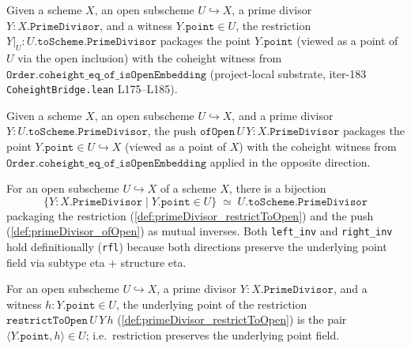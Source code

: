\begin{definition}

  \label{def:primeDivisor_restrictToOpen}
  Given a scheme \(X\), an open subscheme \(U \hookrightarrow X\), a prime
  divisor \(Y : X.\texttt{PrimeDivisor}\), and a witness \(Y.\texttt{point} \in U\),
  the restriction \(Y |_U : U.\texttt{toScheme}.\texttt{PrimeDivisor}\) packages
  the point \(Y.\texttt{point}\) (viewed as a point of \(U\) via the open
  inclusion) with the coheight witness from
  \(\texttt{Order.coheight\_eq\_of\_isOpenEmbedding}\) (project-local
  substrate, iter-183 \texttt{CoheightBridge.lean} L175--L185).
\end{definition}
\begin{definition}

  \label{def:primeDivisor_ofOpen}
  Given a scheme \(X\), an open subscheme \(U \hookrightarrow X\), and a
  prime divisor \(Y : U.\texttt{toScheme}.\texttt{PrimeDivisor}\), the push
  \(\texttt{ofOpen}\,U\,Y : X.\texttt{PrimeDivisor}\) packages the point
  \(Y.\texttt{point} \in U \hookrightarrow X\) (viewed as a point of \(X\))
  with the coheight witness from
  \(\texttt{Order.coheight\_eq\_of\_isOpenEmbedding}\) applied in the
  opposite direction.
\end{definition}
\begin{lemma}

  \label{lem:primeDivisor_equivOpen}
  For an open subscheme \(U \hookrightarrow X\) of a scheme \(X\), there is a
  bijection
  \[
    \{Y : X.\texttt{PrimeDivisor} \mid Y.\texttt{point} \in U\}
    \;\simeq\;
    U.\texttt{toScheme}.\texttt{PrimeDivisor}
  \]
  packaging the restriction (\ref{def:primeDivisor_restrictToOpen}) and the
  push (\ref{def:primeDivisor_ofOpen}) as mutual inverses. Both
  \texttt{left\_inv} and \texttt{right\_inv} hold definitionally
  (\texttt{rfl}) because both directions preserve the underlying point
  field via subtype eta + structure eta.
\end{lemma}
\begin{lemma}

  \label{lem:primeDivisor_restrictToOpen_point}
  For an open subscheme \(U \hookrightarrow X\), a prime divisor
  \(Y : X.\texttt{PrimeDivisor}\), and a witness \(h : Y.\texttt{point} \in U\),
  the underlying point of the restriction
  \(\texttt{restrictToOpen}\,U\,Y\,h\) (\ref{def:primeDivisor_restrictToOpen})
  is the pair \(\langle Y.\texttt{point}, h\rangle \in U\); i.e.\ restriction
  preserves the underlying point field.
\end{lemma}
